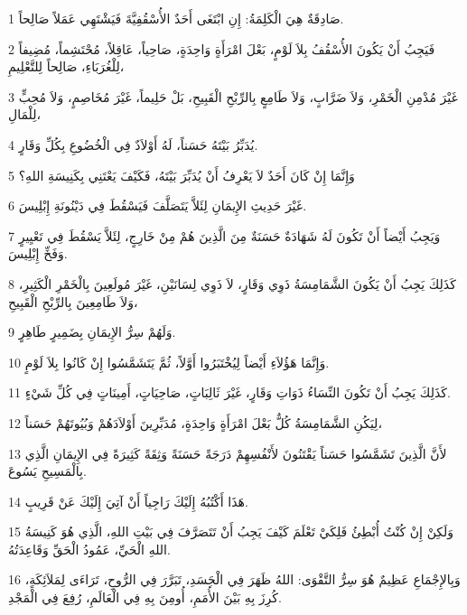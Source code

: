 \par 1 صَادِقَةٌ هِيَ الْكَلِمَةُ: إِنِ ابْتَغَى أَحَدٌ الأُسْقُفِيَّةَ فَيَشْتَهِي عَمَلاً صَالِحاً.
\par 2 فَيَجِبُ أَنْ يَكُونَ الأُسْقُفُ بِلاَ لَوْمٍ، بَعْلَ امْرَأَةٍ وَاحِدَةٍ، صَاحِياً، عَاقِلاً، مُحْتَشِماً، مُضِيفاً لِلْغُرَبَاءِ، صَالِحاً لِلتَّعْلِيمِ،
\par 3 غَيْرَ مُدْمِنِ الْخَمْرِ، وَلاَ ضَرَّابٍ، وَلاَ طَامِعٍ بِالرِّبْحِ الْقَبِيحِ، بَلْ حَلِيماً، غَيْرَ مُخَاصِمٍ، وَلاَ مُحِبٍّ لِلْمَالِ،
\par 4 يُدَبِّرُ بَيْتَهُ حَسَناً، لَهُ أَوْلاَدٌ فِي الْخُضُوعِ بِكُلِّ وَقَارٍ.
\par 5 وَإِنَّمَا إِنْ كَانَ أَحَدٌ لاَ يَعْرِفُ أَنْ يُدَبِّرَ بَيْتَهُ، فَكَيْفَ يَعْتَنِي بِكَنِيسَةِ اللهِ؟
\par 6 غَيْرَ حَدِيثِ الإِيمَانِ لِئَلاَّ يَتَصَلَّفَ فَيَسْقُطَ فِي دَيْنُونَةِ إِبْلِيسَ.
\par 7 وَيَجِبُ أَيْضاً أَنْ تَكُونَ لَهُ شَهَادَةٌ حَسَنَةٌ مِنَ الَّذِينَ هُمْ مِنْ خَارِجٍ، لِئَلاَّ يَسْقُطَ فِي تَعْيِيرٍ وَفَخِّ إِبْلِيسَ.
\par 8 كَذَلِكَ يَجِبُ أَنْ يَكُونَ الشَّمَامِسَةُ ذَوِي وَقَارٍ، لاَ ذَوِي لِسَانَيْنِ، غَيْرَ مُولَعِينَ بِالْخَمْرِ الْكَثِيرِ، وَلاَ طَامِعِينَ بِالرِّبْحِ الْقَبِيحِ،
\par 9 وَلَهُمْ سِرُّ الإِيمَانِ بِضَمِيرٍ طَاهِرٍ.
\par 10 وَإِنَّمَا هَؤُلاَءِ أَيْضاً لِيُخْتَبَرُوا أَوَّلاً، ثُمَّ يَتَشَمَّسُوا إِنْ كَانُوا بِلاَ لَوْمٍ.
\par 11 كَذَلِكَ يَجِبُ أَنْ تَكُونَ النِّسَاءُ ذَوَاتِ وَقَارٍ، غَيْرَ ثَالِبَاتٍ، صَاحِيَاتٍ، أَمِينَاتٍ فِي كُلِّ شَيْءٍ.
\par 12 لِيَكُنِ الشَّمَامِسَةُ كُلٌّ بَعْلَ امْرَأَةٍ وَاحِدَةٍ، مُدَبِّرِينَ أَوْلاَدَهُمْ وَبُيُوتَهُمْ حَسَناً،
\par 13 لأَنَّ الَّذِينَ تَشَمَّسُوا حَسَناً يَقْتَنُونَ لأَنْفُسِهِمْ دَرَجَةً حَسَنَةً وَثِقَةً كَثِيرَةً فِي الإِيمَانِ الَّذِي بِالْمَسِيحِ يَسُوعَ.
\par 14 هَذَا أَكْتُبُهُ إِلَيْكَ رَاجِياً أَنْ آتِيَ إِلَيْكَ عَنْ قَرِيبٍ.
\par 15 وَلَكِنْ إِنْ كُنْتُ أُبْطِئُ فَلِكَيْ تَعْلَمَ كَيْفَ يَجِبُ أَنْ تَتَصَرَّفَ فِي بَيْتِ اللهِ، الَّذِي هُوَ كَنِيسَةُ اللهِ الْحَيِّ، عَمُودُ الْحَقِّ وَقَاعِدَتُهُ.
\par 16 وَبِالإِجْمَاعِ عَظِيمٌ هُوَ سِرُّ التَّقْوَى: اللهُ ظَهَرَ فِي الْجَسَدِ، تَبَرَّرَ فِي الرُّوحِ، تَرَاءَى لِمَلاَئِكَةٍ، كُرِزَ بِهِ بَيْنَ الأُمَمِ، أُومِنَ بِهِ فِي الْعَالَمِ، رُفِعَ فِي الْمَجْدِ.

